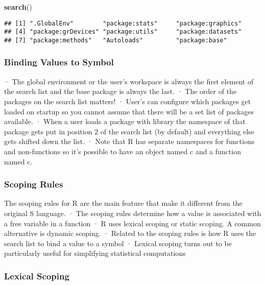 \documentclass[
]{article}
\newenvironment{Shaded}{\begin{snugshade}}{\end{snugshade}}
\newcommand{\FunctionTok}[1]{\textcolor[rgb]{0.13,0.29,0.53}{\textbf{#1}}}
\newcommand{\NormalTok}[1]{#1}
\begin{document}
\begin{Shaded}
\begin{Highlighting}[]
\FunctionTok{search}\NormalTok{()}
\end{Highlighting}
\end{Shaded}

\begin{verbatim}
## [1] ".GlobalEnv"        "package:stats"     "package:graphics" 
## [4] "package:grDevices" "package:utils"     "package:datasets" 
## [7] "package:methods"   "Autoloads"         "package:base"
\end{verbatim}

\hypertarget{binding-values-to-symbol}{%
\subsubsection{Binding Values to
Symbol}\label{binding-values-to-symbol}}

· The global environment or the user's workspace is always the first
element of the search list and the base package is always the last. ·
The order of the packages on the search list matters! · User's can
configure which packages get loaded on startup so you cannot assume that
there will be a set list of packages available. · When a user loads a
package with library the namespace of that package gets put in position
2 of the search list (by default) and everything else gets shifted down
the list. · Note that R has separate namespaces for functions and
non-functions so it's possible to have an object named c and a function
named c.

\hypertarget{scoping-rules-1}{%
\subsubsection{Scoping Rules}\label{scoping-rules-1}}

The scoping rules for R are the main feature that make it different from
the original S language. · The scoping rules determine how a value is
associated with a free variable in a function · R uses lexical scoping
or static scoping. A common alternative is dynamic scoping. · Related to
the scoping rules is how R uses the search list to bind a value to a
symbol · Lexical scoping turns out to be particularly useful for
simplifying statistical computations

\hypertarget{lexical-scoping}{%
\subsubsection{Lexical Scoping}\label{lexical-scoping}}
\end{document}

